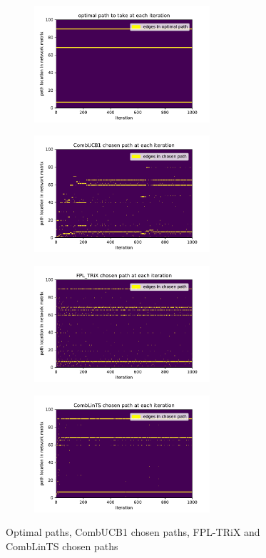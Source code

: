\begin{figure}[h!]
\centering
\begin{subfigure}{.49\textwidth}
  \centering
  \includegraphics[width=65mm]{../plots/stoch_network_opt_paths.pdf}
\end{subfigure}%
\begin{subfigure}{.49\textwidth}
  \centering
  \includegraphics[width=65mm]{../plots/stoch_network_UCB1.pdf}
\end{subfigure}
\begin{subfigure}{.49\textwidth}
  \centering
  \includegraphics[width=65mm]{../plots/stoch_network_FPL.pdf}
\end{subfigure}
\begin{subfigure}{.49\textwidth}
  \centering
  \includegraphics[width=65mm]{../plots/stoch_network_CombLinTS.pdf}
\end{subfigure}
\caption{Optimal paths, CombUCB1 chosen paths, FPL-TRiX and CombLinTS chosen paths}
\label{fig:ullm-particle}
\end{figure}


